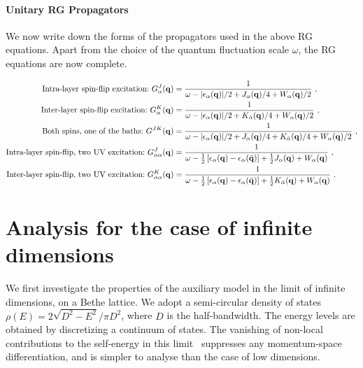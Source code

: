 \documentclass[%
reprint,
superscriptaddress,
groupedaddress,
superscriptaddress,
onecolumn,
10pt
]{revtex4-2}
\begin{document}
\paragraph{Unitary RG Propagators}
We now write down the forms of the propagators used in the above RG equations. Apart from the choice of the quantum fluctuation scale \(\omega\), the RG equations are now complete.

\begin{equation}\begin{aligned}
	\text{Intra-layer spin-flip excitation:}~ G_\alpha^J({\bf q}) &= \frac{1}{\omega - |\epsilon_\alpha({\bf q})| / 2 + J_\alpha({\bf q}) / 4 + W_\alpha({\bf q}) / 2}~,\\
	\text{Inter-layer spin-flip excitation:}~ G_\alpha^K({\bf q}) &= \frac{1}{\omega - |\epsilon_{\alpha}({\bf q})| / 2 + K_{\bar\alpha}({\bf q}) / 4 + W_{\alpha}({\bf q}) / 2}~,\\
	\text{Both spins, one of the baths:}~ G^{JK}({\bf q}) &= \frac{1}{\omega - |\epsilon_\alpha({\bf q})| / 2 + J_\alpha({\bf q})/4 + K_{\bar\alpha}({\bf q})/4 + W_\alpha({\bf q})/2}~,\\
	\text{Intra-layer spin-flip, two UV excitation:}~ G^{J}_{\alpha\alpha}({\bf q}) &= \frac{1}{\omega - \frac{1}{2}\left[\epsilon_\alpha({\bf q}) - \epsilon_\alpha(\bar{\bf q})\right] + \frac{1}{2}J_\alpha({\bf q}) + W_\alpha({\bf q})}~,\\
	\text{Inter-layer spin-flip, two UV excitation:}~ G^{K}_{\alpha\alpha}({\bf q}) &= \frac{1}{\omega - \frac{1}{2}\left[\epsilon_\alpha({\bf q}) - \epsilon_\alpha(\bar{\bf q})\right] + \frac{1}{2}K_{\bar\alpha}({\bf q}) + W_\alpha({\bf q})}~.
\end{aligned}\end{equation}

\section{Analysis for the case of infinite dimensions}
We first investigate the properties of the auxiliary model in the limit of infinite dimensions, on a Bethe lattice. We adopt a semi-circular density of states \(\rho(E) = 2\sqrt{D^2 - E^2}/\pi D^2\), where \(D\) is the half-bandwidth. The energy levels are obtained by discretizing a continuum of states. The vanishing of non-local contributions to the self-energy in this limit~\cite{metzner_volhardt_1989} suppresses any momentum-space differentiation, and is simpler to analyse than the case of low dimensions.
\end{document}
